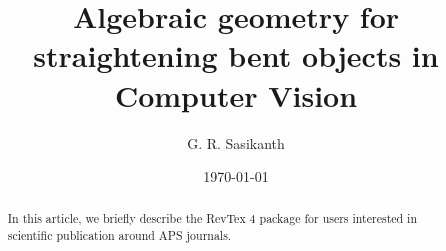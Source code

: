 \documentclass[amsmath,amssymb,
 aps,jmp,preprint,prX]{revtex4-1}
\begin{document}
\title{Algebraic geometry for straightening bent objects in Computer Vision}
\author{G. R. Sasikanth}
\date{\today}
\begin{abstract}
 In this article, we briefly describe the RevTex 4 package for users interested in scientific publication around APS journals.
\end{abstract}

\maketitle
\end{document}
